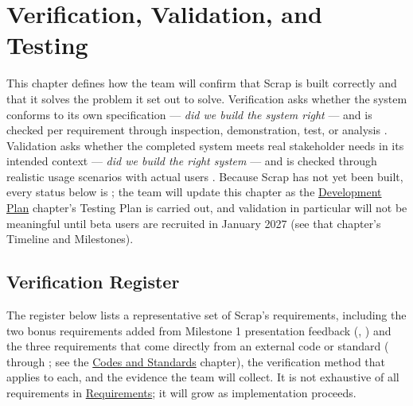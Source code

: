 \chapter{Verification, Validation, and Testing}

\noindent This chapter defines how the team will confirm that Scrap is built correctly and that it solves the problem it set out to solve. Verification asks whether the system conforms to its own specification --- \textit{did we build the system right} --- and is checked per requirement through inspection, demonstration, test, or analysis \cite{IEEE1012}. Validation asks whether the completed system meets real stakeholder needs in its intended context --- \textit{did we build the right system} --- and is checked through realistic usage scenarios with actual users \cite{IEEE1012}. Because Scrap has not yet been built, every status below is \StatusPending; the team will update this chapter as the \hyperref[Chapter:DevelopmentPlan]{Development Plan} chapter's Testing Plan is carried out, and validation in particular will not be meaningful until beta users are recruited in January 2027 (see that chapter's Timeline and Milestones).

\section{Verification Register}

\noindent The register below lists a representative set of Scrap's requirements, including the two bonus requirements added from Milestone 1 presentation feedback (, ) and the three requirements that come directly from an external code or standard ( through ; see the \hyperref[Chapter:CodesStandards]{Codes and Standards} chapter), the verification method that applies to each, and the evidence the team will collect. It is not exhaustive of all requirements in \hyperref[Chapter:Requirements]{Requirements}; it will grow as implementation proceeds.

